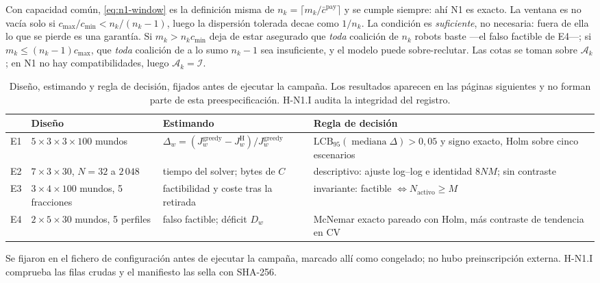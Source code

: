 \documentclass[12pt,a4paper]{article}
\renewcommand{\viuownsource}{%
  \par\vspace{0.8mm}\noindent
  \makebox[\linewidth][c]{\footnotesize\itshape Elaboración propia.}%
  \par
}
\begin{document}
Con capacidad común, \eqref{eq:n1-window} es la definición misma de
$n_k=\lceil m_k/\bar c^{\mathrm{pay}}\rceil$ y se cumple siempre: ahí N1 es
exacto. La ventana es no vacía solo si $c_{\max}/c_{\min}<n_k/(n_k-1)$, luego la
dispersión tolerada decae como $1/n_k$. La condición es \emph{suficiente}, no
necesaria: fuera de ella lo que se pierde es una garantía. Si $m_k>n_kc_{\min}$
deja de estar asegurado que \emph{toda} coalición de $n_k$ robots baste —el falso
factible de E4—; si $m_k\leq(n_k-1)c_{\max}$, que \emph{toda} coalición de a lo
sumo $n_k-1$ sea insuficiente, y el modelo puede sobre-reclutar. Las cotas se
toman sobre $\mathcal A_k$; en N1 no hay compatibilidades, luego
$\mathcal A_k=\mathcal I$.

\begin{table}[H]
\centering
{\scriptsize
\renewcommand{\arraystretch}{1.0}
\begin{tabularx}{\textwidth}{@{}p{0.45cm}p{2.4cm}p{2.9cm}Y@{}}
\toprule
 & \textbf{Diseño} & \textbf{Estimando} & \textbf{Regla de decisión} \\
\midrule
E1 & $5\times3\times3\times100$ mundos &
 $\Delta_w=(J^{\mathrm{greedy}}_w-J^{\mathrm{H}}_w)/J^{\mathrm{greedy}}_w$ &
 $\mathrm{LCB}_{95}(\operatorname{mediana}\Delta)>0{,}05$ y signo exacto, Holm
 sobre cinco escenarios \\
E2 & $7\times3\times30$, $N=32$ a $2\,048$ &
 tiempo del solver; bytes de $C$ &
 descriptivo: ajuste log--log e identidad $8NM$; sin contraste \\
E3 & $3\times4\times100$ mundos, 5 fracciones &
 factibilidad y coste tras la retirada &
 invariante: factible $\iff N_{\mathrm{activo}}\geq M$ \\
E4 & $2\times5\times30$ mundos, 5 perfiles &
 falso factible; déficit $D_w$ &
 McNemar exacto pareado con Holm, más contraste de tendencia en $\mathrm{CV}$ \\
\bottomrule
\end{tabularx}
}
\caption{Diseño, estimando y regla de decisión, fijados antes de ejecutar la
campaña. Los resultados aparecen en las páginas siguientes y no forman parte de
esta preespecificación. H-N1.I audita la integridad del registro.}
\label{tab:n1-experimental-design}
\viuownsource
\end{table}

Se fijaron en el fichero de configuración antes de ejecutar la campaña, marcado
allí como congelado; no hubo preinscripción externa. H-N1.I comprueba las
\NOneRows{} filas crudas y el manifiesto las sella con SHA-256.
\end{document}
